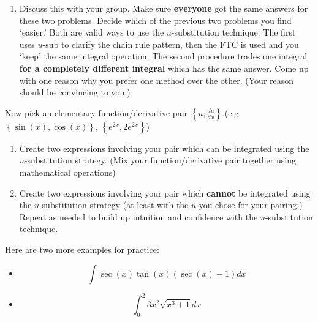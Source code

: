 \documentclass{ximera}
\begin{document}
\begin{exercise}
\begin{enumerate}
\begin{enumerate}
            \end{enumerate}
        \item Discuss this with your group. Make sure {\bf{everyone}} got the same answers for these two problems. Decide which of the previous two problems you find `easier.' Both are valid ways to use the $u$-substitution technique. The first uses $u$-sub to clarify the chain rule pattern, then the FTC is used and you `keep' the same integral operation. The second procedure trades one integral {\bf{for a completely different integral}} which has the same answer. Come up with one reason why you prefer one method over the other. (Your reason should be convincing to you.)
        \end{enumerate}
\end{exercise}

\begin{exercise}
    Now pick an elementary function/derivative pair $\left\{ u, \frac{du}{dx}\right\}$.(e.g. $\left\{\sin(x),\cos(x)\right\}$, $\left\{e^{2x},2e^{2x}\right\}$) 
    \begin{enumerate}

    \item Create two expressions involving your pair which can be integrated using the $u$-substitution strategy. (Mix your function/derivative pair together using mathematical operations)


    \item Create two expressions involving your pair which {\bf{cannot}} be integrated using the $u$-substitution strategy (at least with the $u$ you chose for your pairing.)\\
    
    Repeat as needed to build up intuition and confidence with the $u$-substitution technique. 
    \end{enumerate}
\end{exercise}

\begin{exercise}
    Here are two more examples for practice: 
        \begin{itemize}
            \item $$\int \sec(x)\tan(x)(\sec(x)-1)dx$$
            \item $$\int_0^2 3x^2\sqrt{x^3+1}dx$$
        \end{itemize}

\end{exercise}
\end{document}
